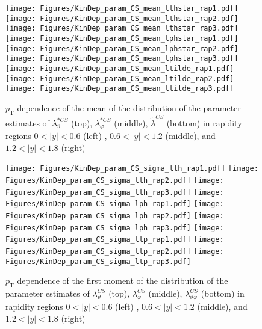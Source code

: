 \documentclass[12pt]{article}
\newcommand{\pT}{p_\mathrm{T}}
\newcommand{\absy}{\left |  y \right |}
\newcommand{\lamthCS}{\lambda^{\scriptscriptstyle CS}_\vartheta}
\newcommand{\lamphCS}{\lambda^{\scriptscriptstyle CS}_\varphi}
\newcommand{\lamthphCS}{\lambda^{\scriptscriptstyle CS}_{\vartheta \varphi}}
\newcommand{\lamtildeCS}{\tilde{\lambda}^{\scriptscriptstyle CS}}
\newcommand{\lamthstarCS}{\lambda^{* \scriptscriptstyle CS}_\vartheta}
\newcommand{\lamphstarCS}{\lambda^{* \scriptscriptstyle CS}_\varphi}
\begin{document}
\begin{figure}[htbp]
\centering
\texttt{[image: Figures/KinDep\_param\_CS\_mean\_lthstar\_rap1.pdf]}
\texttt{[image: Figures/KinDep\_param\_CS\_mean\_lthstar\_rap2.pdf]}
\texttt{[image: Figures/KinDep\_param\_CS\_mean\_lthstar\_rap3.pdf]}
\texttt{[image: Figures/KinDep\_param\_CS\_mean\_lphstar\_rap1.pdf]}
\texttt{[image: Figures/KinDep\_param\_CS\_mean\_lphstar\_rap2.pdf]}
\texttt{[image: Figures/KinDep\_param\_CS\_mean\_lphstar\_rap3.pdf]}
\texttt{[image: Figures/KinDep\_param\_CS\_mean\_ltilde\_rap1.pdf]}
\texttt{[image: Figures/KinDep\_param\_CS\_mean\_ltilde\_rap2.pdf]}
\texttt{[image: Figures/KinDep\_param\_CS\_mean\_ltilde\_rap3.pdf]}
\caption{$\pT$ dependence of the mean of the distribution of the parameter estimates of $\lamthstarCS$ (top), $\lamphstarCS$ (middle), $\lamtildeCS$ (bottom) in rapidity regions $0<\absy<0.6$ (left) , $0.6<\absy<1.2$ (middle), and $1.2<\absy<1.8$ (right)}
\end{figure}
\clearpage


\begin{figure}[htbp]
\centering
\texttt{[image: Figures/KinDep\_param\_CS\_sigma\_lth\_rap1.pdf]}
\texttt{[image: Figures/KinDep\_param\_CS\_sigma\_lth\_rap2.pdf]}
\texttt{[image: Figures/KinDep\_param\_CS\_sigma\_lth\_rap3.pdf]}
\texttt{[image: Figures/KinDep\_param\_CS\_sigma\_lph\_rap1.pdf]}
\texttt{[image: Figures/KinDep\_param\_CS\_sigma\_lph\_rap2.pdf]}
\texttt{[image: Figures/KinDep\_param\_CS\_sigma\_lph\_rap3.pdf]}
\texttt{[image: Figures/KinDep\_param\_CS\_sigma\_ltp\_rap1.pdf]}
\texttt{[image: Figures/KinDep\_param\_CS\_sigma\_ltp\_rap2.pdf]}
\texttt{[image: Figures/KinDep\_param\_CS\_sigma\_ltp\_rap3.pdf]}
\caption{$\pT$ dependence of the first moment of the distribution of the parameter estimates of $\lamthCS$ (top), $\lamphCS$ (middle), $\lamthphCS$ (bottom) in rapidity regions $0<\absy<0.6$ (left) , $0.6<\absy<1.2$ (middle), and $1.2<\absy<1.8$ (right)}
\end{figure}
\clearpage
\end{document}
